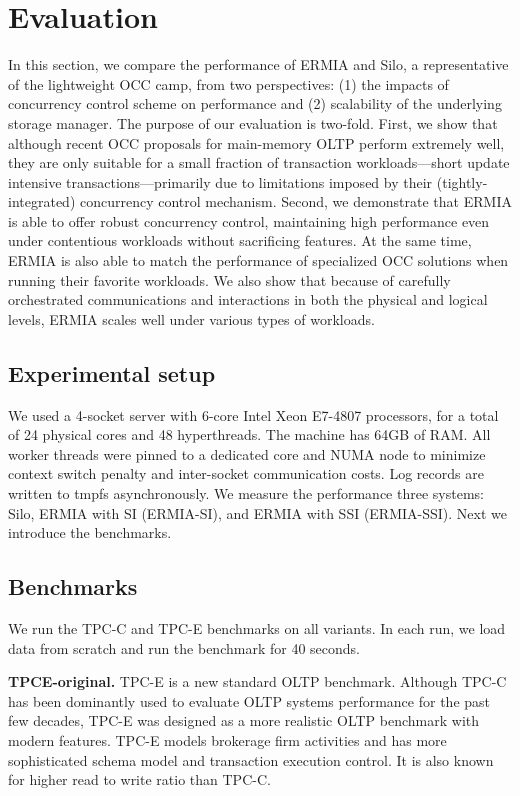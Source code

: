 
\section{Evaluation}
In this section, we compare the performance of ERMIA and Silo, a representative of the lightweight OCC camp, from two perspectives: (1) the impacts of concurrency control scheme on performance and (2) scalability of the underlying storage manager. The purpose of our evaluation is two-fold. First, we show that although recent OCC proposals for main-memory OLTP perform extremely well, they are only suitable for a small fraction of transaction workloads---short update intensive transactions---primarily due to limitations imposed by their (tightly-integrated) concurrency control mechanism. Second, we demonstrate that ERMIA is able to offer robust concurrency control, maintaining high performance even under contentious workloads without sacrificing features. At the same time, ERMIA is also able to match the performance of specialized OCC solutions when running their favorite workloads. We also show that because of carefully orchestrated communications and interactions in both the physical and logical levels, ERMIA scales well under various types of workloads.

\subsection{Experimental setup}
We used a 4-socket server with 6-core Intel Xeon E7-4807 processors, for a total of 24 physical cores and 48 hyperthreads. The machine has 64GB of RAM. All worker threads were pinned to a dedicated core and NUMA node to minimize context switch penalty and inter-socket communication costs. Log records are written to tmpfs asynchronously. We measure the performance three systems: Silo, ERMIA with SI (ERMIA-SI), and ERMIA with SSI (ERMIA-SSI). Next we introduce the benchmarks.

\subsection{Benchmarks}
We run the TPC-C and TPC-E benchmarks on all variants. In each run, we load data from scratch and run the benchmark for 40 seconds.


\textbf{TPCE-original.}
TPC-E is a new standard OLTP benchmark. Although TPC-C has been dominantly used to evaluate OLTP systems performance for the past few decades, TPC-E was designed as a more realistic OLTP benchmark with modern features.  TPC-E models brokerage firm activities and has more sophisticated schema model and transaction execution control. It is also known for higher read to write ratio than TPC-C.


